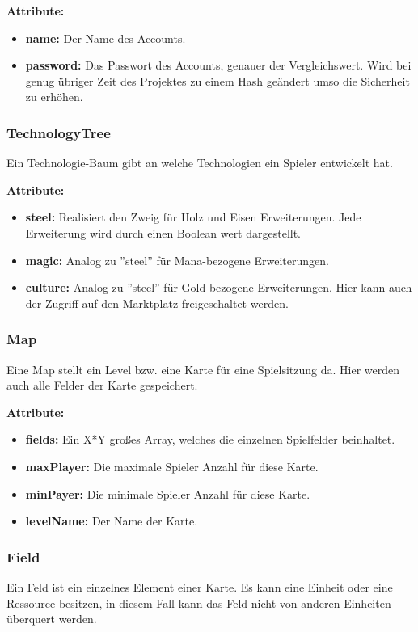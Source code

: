\documentclass[fontsize=12pt,paper=a4,twoside]{scrartcl}
\begin{document}
\textbf{Attribute:}
\begin{itemize}
\item \textbf{name:} Der Name des Accounts.
\item \textbf{password:} Das Passwort des Accounts, genauer der Vergleichswert. Wird bei genug übriger Zeit des Projektes zu einem Hash geändert umso die Sicherheit zu erhöhen.
\end{itemize}

\subsubsection{TechnologyTree}

Ein Technologie-Baum gibt an welche Technologien ein Spieler entwickelt hat.

\textbf{Attribute:}
\begin{itemize}
\item \textbf{steel:} Realisiert den Zweig für Holz und Eisen Erweiterungen. Jede Erweiterung wird durch einen Boolean wert dargestellt.
\item \textbf{magic:} Analog zu ''steel'' für Mana-bezogene Erweiterungen.
\item \textbf{culture:} Analog zu ''steel'' für Gold-bezogene Erweiterungen. Hier kann auch der Zugriff auf den Marktplatz freigeschaltet werden. 
\end{itemize}

\subsubsection{Map}

Eine Map stellt ein Level bzw. eine Karte für eine Spielsitzung da. Hier werden auch alle Felder der Karte gespeichert.

\textbf{Attribute:}
\begin{itemize}
\item \textbf{fields:} Ein X*Y großes Array, welches die einzelnen Spielfelder beinhaltet.
\item \textbf{maxPlayer:} Die maximale Spieler Anzahl für diese Karte.
\item \textbf{minPayer:} Die minimale Spieler Anzahl für diese Karte.
\item \textbf{levelName:} Der Name der Karte.
\end{itemize}

\subsubsection{Field}
Ein Feld ist ein einzelnes Element einer Karte. Es kann eine Einheit oder eine Ressource besitzen, in diesem Fall kann das Feld nicht von anderen Einheiten überquert werden.
\end{document}
